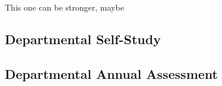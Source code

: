 \documentclass[../../../main.tex]{subfiles}
\begin{document}
This one can be stronger, maybe

\subsection{Departmental Self-Study}

\subsection{Departmental Annual Assessment}
\end{document}
